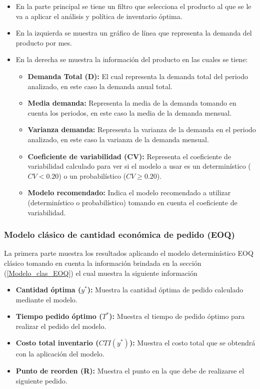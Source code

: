 \begin{itemize}
  \item En la parte principal se tiene un filtro que selecciona el producto al que se le va a aplicar el análisis y política de inventario óptima.
  \item En la izquierda se muestra un gráfico de línea que representa la demanda del producto por mes.
  \item En la derecha se muestra la información del producto en las cuales se tiene:
  \begin{itemize}
    \item \textbf{Demanda Total (D):} El cual representa la demanda total del periodo analizado, en este caso la demanda anual total.
    \item \textbf{Media demanda:} Representa la media de la demanda tomando en cuenta los periodos, en este caso la media de la demanda mensual.
    \item \textbf{Varianza demanda:} Representa la varianza de la demanda en el periodo analizado, en este caso la varianza de la demanda mensual.
    \item \textbf{Coeficiente de variabilidad (CV):} Representa el coeficiente de variabilidad calculado para ver si el modelo a usar es un determinístico ($CV < 0.20$) o un probabilístico ($CV \geq 0.20$).
    \item \textbf{Modelo recomendado:} Indica el modelo recomendado a utilizar (determinístico o probabilístico) tomando en cuenta el coeficiente de variabilidad.
  \end{itemize}
\end{itemize}


\subsubsection{Modelo clásico de cantidad económica de pedido (EOQ)}
La primera parte muestra los resultados aplicando el modelo determinístico EOQ clásico tomando en cuenta la información brindada en la sección (\ref{Modelo_clas_EOQ}) el cual muestra la siguiente información

\begin{itemize}
  \item \textbf{Cantidad óptima ($y^*$):} Muestra la cantidad óptima de pedido calculado mediante el modelo.
  \item \textbf{Tiempo pedido óptimo ($T^*$):} Muestra el tiempo de pedido óptimo para realizar el pedido del modelo.
  \item \textbf{Costo total inventario ($CTI(y^*)$):} Muestra el costo total que se obtendrá con la aplicación del modelo.
  \item \textbf{Punto de reorden (R):} Muestra el punto en la que debe de realizarse el siguiente pedido.
\end{itemize}


